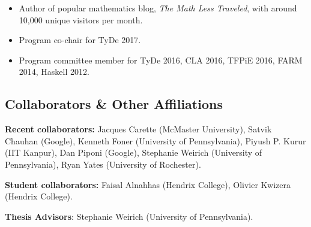 \begin{itemize}
  \item Author of popular mathematics blog, \emph{The Math Less
    Traveled}, with around 10,000 unique visitors per month.

  \item Program co-chair for TyDe 2017.

  \item Program committee member for TyDe 2016, CLA 2016, TFPiE 2016,
    FARM 2014, Haskell 2012.

\end{itemize}

\subsection*{Collaborators \& Other Affiliations}

\noindent

\textbf{Recent collaborators:} Jacques Carette (McMaster University),
Satvik Chauhan (Google), Kenneth Foner (University of Pennsylvania),
Piyush P. Kurur (IIT Kanpur), Dan Piponi (Google), Stephanie Weirich
(University of Pennsylvania), Ryan Yates (University of Rochester).

{\bf Student collaborators:} Faisal Alnahhas (Hendrix College),
Olivier Kwizera (Hendrix College).

\textbf{Thesis Advisors}: Stephanie Weirich (University of Pennsylvania).
